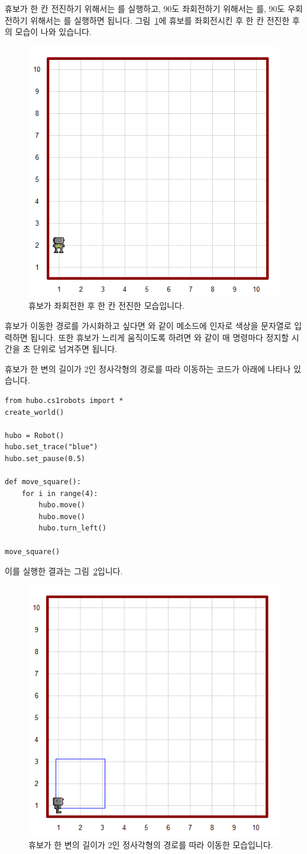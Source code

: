 \documentclass[../main.tex]{subfiles}
\begin{document}
휴보가 한 칸 전진하기 위해서는 를 실행하고, 90도 좌회전하기 위해서는 를, 90도 우회전하기 위해서는 를 실행하면 됩니다.
그림~\ref{fig:lecture4:huboleftmove}에 휴보를 좌회전시킨 후 한 칸 전진한 후의 모습이 나와 있습니다.
\begin{figure}[htbp]
\centering
\includegraphics[width=0.5\linewidth]{"./lectures/lecture4_huboleftmove"}
\caption{휴보가 좌회전한 후 한 칸 전진한 모습입니다.}\label{fig:lecture4:huboleftmove}
\end{figure}

휴보가 이동한 경로를 가시화하고 싶다면 와 같이  메소드에 인자로 색상을 문자열로 입력하면 됩니다.
또한 휴보가 느리게 움직이도록 하려면 와 같이 매 명령마다 정지할 시간을 초 단위로 넘겨주면 됩니다.

휴보가 한 변의 길이가 2인 정사각형의 경로를 따라 이동하는 코드가 아래에 나타나 있습니다.
\begin{verbatim}
from hubo.cs1robots import *
create_world()

hubo = Robot()
hubo.set_trace("blue")
hubo.set_pause(0.5)

def move_square():
    for i in range(4):
        hubo.move()
        hubo.move()
        hubo.turn_left()

move_square()
\end{verbatim}
이를 실행한 결과는 그림~\ref{fig:lecture4:hubosquare}입니다.

\begin{figure}[htbp]
\centering
\includegraphics[width=0.5\linewidth]{"./lectures/lecture4_hubosquare"}
\caption{휴보가 한 변의 길이가 2인 정사각형의 경로를 따라 이동한 모습입니다.}\label{fig:lecture4:hubosquare}
\end{figure}
\end{document}
